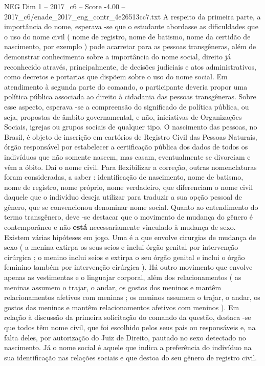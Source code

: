 \begin{textsample}{NEG Dim 1 – 2017\_c6 – Score -4.00 – 2017\_c6/enade\_2017\_eng\_contr\_4e26513cc7.txt}
A respeito da primeira parte, a importância do nome, esperava -se que o estudante abordasse as dificuldades que o uso do nome civil ( nome de registro, nome de batismo, nome da certidão de nascimento, por exemplo ) pode acarretar para as pessoas transgêneras, além de demonstrar conhecimento sobre a importância do nome social, direito já reconhecido através, principalmente, de decisões judiciais e atos administrativos, como decretos e portarias que dispõem sobre o uso do nome social.
Em atendimento à segunda parte do comando, o participante deveria propor uma política pública associada ao direito à cidadania das pessoas transgêneras.
Sobre esse aspecto, esperava -se a compreensão do significado de política pública, ou seja, propostas de âmbito governamental, e não, iniciativas de Organizações Sociais, igrejas ou grupos sociais de qualquer tipo.
O nascimento das pessoas, no Brasil, é objeto de inscrição em cartórios de Registro Civil das Pessoas Naturais, órgão responsável por estabelecer a certificação pública dos dados de todos os indivíduos que não somente nascem, mas casam, eventualmente se divorciam e vêm a óbito.
Daí o nome civil.
Para flexibilizar a correção, outras nomenclaturas foram consideradas, a saber : identificação de nascimento, nome de batismo, nome de registro, nome próprio, nome verdadeiro, que diferenciam o nome civil daquele que o indivíduo deseja utilizar para traduzir a sua opção pessoal de gênero, que se convencionou denominar nome social.
Quanto ao entendimento do termo transgênero, deve -se destacar que o movimento de mudança do gênero é contemporâneo e não \textbf{está} necessariamente vinculado à mudança de sexo.
Existem várias hipóteses em jogo.
Uma é a que envolve cirurgias de mudança de sexo ( a menina extirpa os seus seios e inclui órgão genital por intervenção cirúrgica ; o menino inclui seios e extirpa o seu órgão genital e inclui o órgão feminino também por intervenção cirúrgica ).
Há outro movimento que envolve apenas as vestimentas e o linguajar corporal, além dos relacionamentos ( as meninas assumem o trajar, o andar, os gostos dos meninos e mantêm relacionamentos afetivos com meninas ; os meninos assumem o trajar, o andar, os gostos das meninas e mantêm relacionamentos afetivos com meninos ).
Em relação à discussão da primeira solicitação do comando da questão, destaca -se que todos têm nome civil, que foi escolhido pelos seus pais ou responsáveis e, na falta deles, por autorização do Juiz de Direito, pautado no sexo detectado no nascimento.
Já o nome social é aquele que indica a preferência do indivíduo na sua identificação nas relações sociais e que destoa do seu gênero de registro civil.

\end{textsample}
